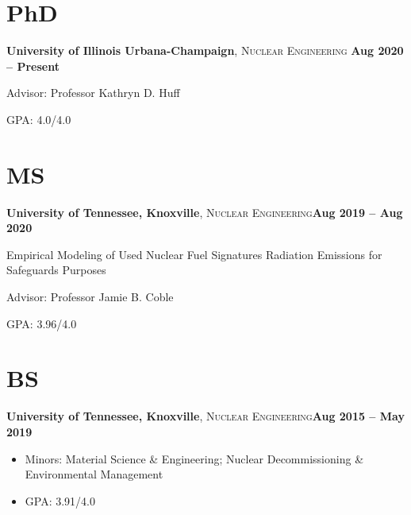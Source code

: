 \documentclass[margin,line]{resume}
\begin{document}
\begin{resume}
    \section{\mysidestyle PhD}
    \textbf{University of Illinois Urbana-Champaign}, \textsc{Nuclear Engineering}\hfill \textbf{ Aug 2020 -- Present}\vspace{-3mm}\\\vspace{-1mm}%
    \begin{list2}
        \item Advisor:  Professor Kathryn D. Huff
        \item GPA: 4.0/4.0
    \end{list2}\vspace{-1.5mm}
    \section{\mysidestyle MS}
    \textbf{University of Tennessee, Knoxville}, \textsc{Nuclear Engineering}\hfill\textbf{Aug 2019 -- Aug 2020}\vspace{-3mm}\\\vspace{-1mm}%
    \begin{list2}
        \item Empirical Modeling of Used Nuclear Fuel Signatures Radiation Emissions for Safeguards Purposes
        \item Advisor: Professor Jamie B. Coble
        \item GPA: 3.96/4.0
    \end{list2}
    \section{\mysidestyle BS}
    \textbf{University of Tennessee, Knoxville}, \textsc{Nuclear Engineering}\hfill\textbf{Aug 2015 -- May 2019}\vspace{-3mm}\\\vspace{-1mm}%
    \begin{itemize}
        \item Minors: Material Science \& Engineering; Nuclear 
              Decommissioning \& Environmental Management
        \item GPA: 3.91/4.0
    \end{itemize}
    

\end{resume}
\end{document}
